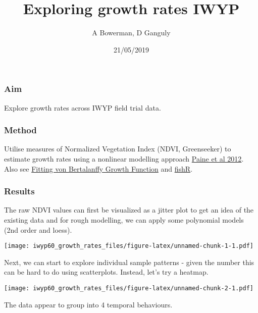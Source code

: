 \documentclass[]{article}
\title{Exploring growth rates IWYP}
\author{A Bowerman, D Ganguly}
\date{21/05/2019}
\begin{document}
\maketitle

\subsubsection{Aim}\label{aim}

Explore growth rates across IWYP field trial data.

\subsubsection{Method}\label{method}

Utilise measures of Normalized Vegetation Index (NDVI, Greenseeker) to
estimate growth rates using a nonlinear modelling approach
\href{https://besjournals.onlinelibrary.wiley.com/doi/full/10.1111/j.2041-210X.2011.00155.x}{Paine
et al 2012}. Also see \href{http://rpubs.com/lacs/1123}{Fitting von
Bertalanffy Growth Function} and
\href{http://derekogle.com/fishR/examples/oldFishRVignettes/VonBertalanffy.pdf}{fishR}.

\subsubsection{Results}\label{results}

The raw NDVI values can first be visualized as a jitter plot to get an
idea of the existing data and for rough modelling, we can apply some
polynomial models (2nd order and loess).

\texttt{[image: iwyp60\_growth\_rates\_files/figure-latex/unnamed-chunk-1-1.pdf]}

Next, we can start to explore individual sample patterns - given the
number this can be hard to do using scatterplots. Instead, let's try a
heatmap.

\texttt{[image: iwyp60\_growth\_rates\_files/figure-latex/unnamed-chunk-2-1.pdf]}

The data appear to group into 4 temporal behaviours.
\end{document}
